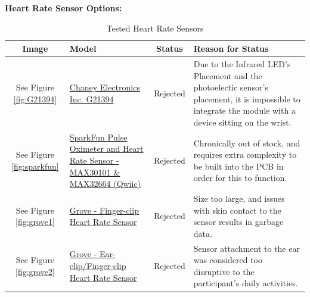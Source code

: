 \documentclass[12pt, titlepage]{article}
\begin{document}
\textbf{Heart Rate Sensor Options:}

\begin{table}[H]

  \label{HRSensors}\caption{Tested Heart Rate Sensors}
  \begin{tabular}{ | c | m{3cm} | c | m{7cm} |}
    \hline
    \textbf{Image}                              & \textbf{Model}                                                                                                                                                    & \textbf{Status} & \textbf{Reason for Status}                                                                                                                                                                                                                                               \\
    \hline
    See Figure \ref{fig:G21394}    & \href{https://secure.sayal.com/STORE2/View_SHOP.php?SKU=247799}{Chaney Electronics Inc. G21394}                                                                   & Rejected        & Due to the Infrared LED's Placement and the photoelectic sensor's placement, it is impossible to integrate the module with a device sitting on the wrist.                                                                                                                \\
    \hline
    See Figure \ref{fig:sparkfun}     & \href{https://www.sparkfun.com/products/15219}{SparkFun Pulse Oximeter and Heart Rate Sensor - MAX30101 \& MAX32664 (Qwiic)}                                      & Rejected        & Chronically out of stock, and requires extra complexity to be built into the PCB in order for this to function.                                                                                                                                                          \\
    \hline
    See Figure \ref{fig:grove1}      & \href{https://www.seeedstudio.com/Grove-Finger-clip-Heart-Rate-Sensor.html?queryID=ad9334e40c7058a87ffd810044eecd1c                                               & objectID=711    & indexName=bazaar_retailer_products}{Grove - Finger-clip Heart Rate Sensor}                                                                                & Rejected & Size too large, and issues with skin contact to the sensor results in garbage data.               \\
    \hline
    See Figure \ref{fig:grove2}      & \href{https://www.seeedstudio.com/Grove-Ear-clip-Heart-Rate-Sensor.html?queryID=ad9334e40c7058a87ffd810044eecd1c                                                  & objectID=2143   & indexName=bazaar_retailer_products}{Grove - Ear-clip/Finger-clip Heart Rate Sensor}                                                                       & Rejected & Sensor attachment to the ear was considered too disruptive to the participant's daily activities. \\

\end{tabular}
\end{table}
\end{document}
